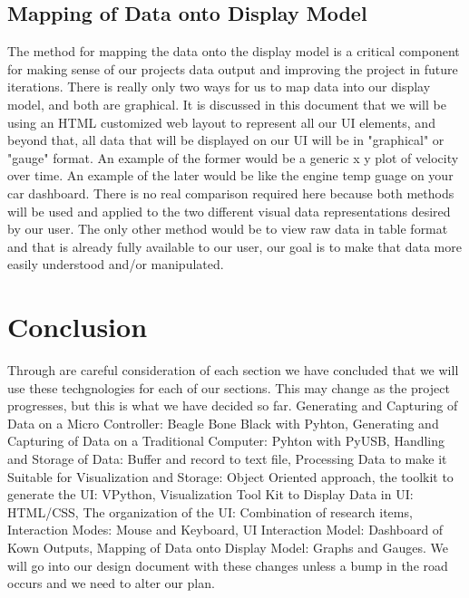 \documentclass[10pt,draftclsnofoot,onecolumn,retainorgcmds]{IEEEtran}
\begin{document}
\subsection{Mapping of Data onto Display Model}
The method for mapping the data onto the display model is a critical component for making sense of our projects data output and improving the project in future iterations. There is really only two ways for us to map data into our display model, and both are graphical. It is discussed in this document that we will be using an HTML customized web layout to represent all our UI elements, and beyond that, all data that will be displayed on our UI will be in "graphical" or "gauge" format. An example of the former would be a generic x y plot of velocity over time. An example of the later would be like the engine temp guage on your car dashboard. There is no real comparison required here because both methods will be used and applied to the two different visual data representations desired by our user. The only other method would be to view raw data in table format and that is already fully available to our user, our goal is to make that data more easily understood and/or manipulated.\par

\section{Conclusion}
Through are careful consideration of each section we have concluded that we will use these techgnologies for each of our sections. This may change as the project progresses, but this is what we have decided so far. Generating and Capturing of Data on a Micro Controller: Beagle Bone Black with Pyhton, Generating and Capturing of Data on a Traditional Computer: Pyhton with PyUSB, Handling and Storage of Data: Buffer and record to text file, Processing Data to make it Suitable for Visualization and Storage: Object Oriented approach, the toolkit to generate the UI: VPython, Visualization Tool Kit to Display Data in UI: HTML/CSS, The organization of the UI: Combination of research items, Interaction Modes: Mouse and Keyboard, UI Interaction Model: Dashboard of Kown Outputs, Mapping of Data onto Display Model: Graphs and Gauges. We will go into our design document with these changes unless a bump in the road occurs and we need to alter our plan.
\end{document}
